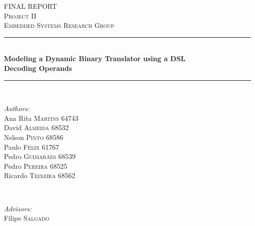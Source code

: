 \documentclass[12pt]{article}
\begin{document}
\begin{titlepage}

\newcommand{\HRule}{\rule{\linewidth}{0.5mm}} %

\center %
 

\textsc{\LARGE FINAL REPORT}\\[1.0cm] %
\textsc{\Large Project II}\\[0.5cm] %
\textsc{\large Embedded Systems Research Group}\\[0.5cm] %


\HRule \\[1.2cm]
{ \Huge \bfseries 
Modeling a Dynamic Binary Translator using a DSL}\\[1.0cm] %
{ \Large \bfseries 
Decoding Operands}\\[0.4cm]

\HRule \\[0.9cm]
 
\begin{minipage}{0.4\textwidth}
\begin{flushleft} \large
\emph{Authors:}\\
Ana Rita \textsc{Martins} 64743 \\
David \textsc{Almeida} 68532 \\
Nelson \textsc{Pinto} 68586 \\
Paulo \textsc{Félix} 61767  \\
Pedro \textsc{Guimarães} 68539 \\
Pedro \textsc{Pereira} 68525 \\
Ricardo \textsc{Teixeira} 68562

\end{flushleft}
\end{minipage}
~
\begin{minipage}{0.4\textwidth}
\begin{flushright} \large
 \emph{Advisors:} \\
Filipe \textsc{Salgado} \\ %
\end{flushright}
\end{minipage}\\[2cm]


\end{titlepage}
\end{document}
